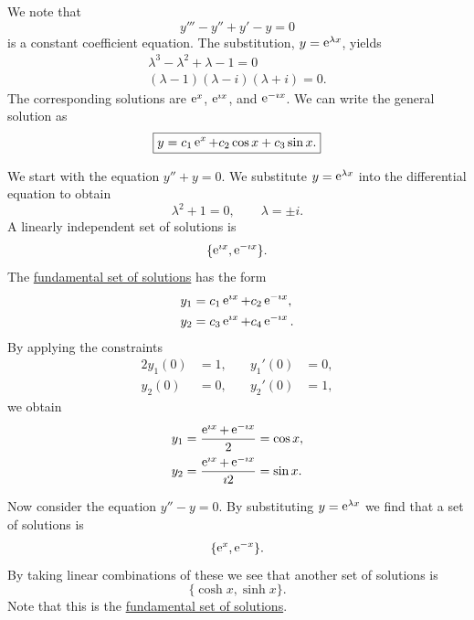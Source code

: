{%
\begin{Solution}
  \label{solution y-y+y-y=0}
  We note that 
  \[ 
  y''' - y'' + y' - y = 0 
  \]
  is a constant coefficient equation.  The substitution, $y = \mathop{\mathrm{e}}\nolimits^{\lambda x}$,
  yields
  \begin{gather*}
    \lambda^3 - \lambda^2 + \lambda - 1 = 0 \\
    (\lambda-1)(\lambda-i)(\lambda+i) = 0.
  \end{gather*}
  The corresponding solutions are $\mathop{\mathrm{e}}\nolimits^x$, $\mathop{\mathrm{e}}\nolimits^{\imath x}$, and $\mathop{\mathrm{e}}\nolimits^{-\imath x}$.  We 
  can write the general solution as
  \[ 
  \boxed{
    y = c_1 \mathop{\mathrm{e}}\nolimits^x + c_2 \cos x + c_3 \sin x. 
    } 
  \]
\end{Solution}



\begin{Solution}
  \label{solution fund set x=0 x=1}
  We start with the equation $y'' + y = 0$.  We substitute $y = \mathop{\mathrm{e}}\nolimits^{\lambda x}$
  into the differential equation to obtain
  \[
  \lambda^2 + 1 = 0, \qquad \lambda = \pm i.
  \]
  A linearly independent set of solutions is
  \[
  \{ \mathop{\mathrm{e}}\nolimits^{\imath x}, \mathop{\mathrm{e}}\nolimits^{-\imath x} \}.
  \]
  The 
  \hyperref[section The Fundamental Set of Solutions]
    {fundamental set of solutions}
  has the form
  \begin{align*}
    y_1 &= c_1 \mathop{\mathrm{e}}\nolimits^{\imath x} + c_2 \mathop{\mathrm{e}}\nolimits^{-\imath x}, \\
    y_2 &= c_3 \mathop{\mathrm{e}}\nolimits^{\imath x} + c_4 \mathop{\mathrm{e}}\nolimits^{-\imath x}.
  \end{align*}
  By applying the constraints
  \begin{alignat*}{2}
    y_1(0) &= 1, &\quad y_1'(0) &= 0, \\
    y_2(0) &= 0, &\quad y_2'(0) &= 1, 
  \end{alignat*}
  we obtain
  \begin{align*}
    y_1 &= \frac{\mathop{\mathrm{e}}\nolimits^{\imath x} + \mathop{\mathrm{e}}\nolimits^{-\imath x}}{2} = \cos x, \\
    y_2 &= \frac{\mathop{\mathrm{e}}\nolimits^{\imath x} + \mathop{\mathrm{e}}\nolimits^{-\imath x}}{\imath 2} = \sin x.
  \end{align*}

  Now consider the equation $y'' - y = 0$.  By substituting $y = \mathop{\mathrm{e}}\nolimits^{\lambda x}$
  we find that a set of solutions is
  \[
  \{ \mathop{\mathrm{e}}\nolimits^x, \mathop{\mathrm{e}}\nolimits^{-x} \}.
  \]
  By taking linear combinations of these we see that another set of solutions 
  is
  \[
  \{ \cosh x, \sinh x \}.
  \]
  Note that this is the 
  \hyperref[section The Fundamental Set of Solutions]
    {fundamental set of solutions}.


\end{Solution}}
